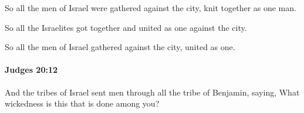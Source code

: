 			\begin{versebox}
					\item[BHS] 
					\item[ASV] So all the men of Israel were gathered against the city, knit together as one man.
					\item[NIV] So all the Israelites got together and united as one against the city.
					\item[NRSV] So all the men of Israel gathered against the city, united as one.
			\end{versebox}

		\paragraph{Judges 20:12} %
			\label{JUDGES-20-12}

			And the tribes of Israel sent men through all the tribe of Benjamin, saying, What wickedness is this that is done among you?

